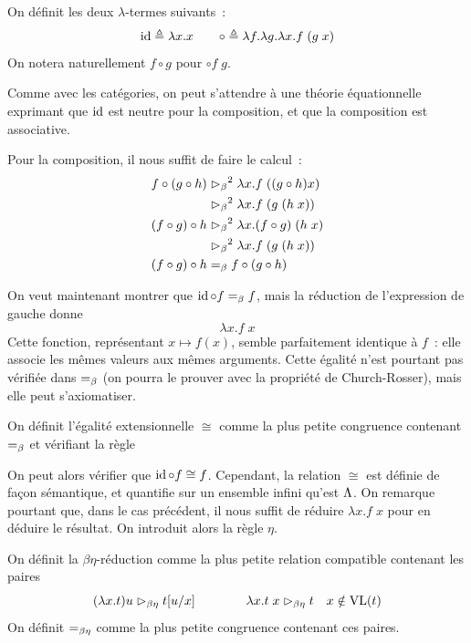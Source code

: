 \begin{definition}
  On définit les deux $\lambda$-termes suivants~:
  \[\operatorname{id} \triangleq \lambda x.x \qquad \mathord{\circ} \triangleq
  \lambda f.\lambda g.\lambda x.f\;(g\;x)\]
  On notera naturellement $f\circ g$ pour $\mathbin{\circ}f\;g$.
\end{definition}

Comme avec les catégories, on peut s'attendre à une théorie équationnelle
exprimant que $\operatorname{id}$ est neutre pour la composition, et que la composition est
associative.

Pour la composition, il nous suffit de faire le calcul~:
\begin{align*}
  f\circ (g\circ h) &\mathrel{\rhd_{\beta}}^2 \lambda x. f\;((g\circ h) x)\\
  &\mathrel{\rhd_{\beta}}^2 \lambda x. f\;(g\;(h\;x))\\
  (f\circ g)\circ h &\mathrel{\rhd_{\beta}}^2 \lambda x. (f\circ g)\;(h\;x)\\
  &\mathrel{\rhd_{\beta}}^2 \lambda x. f\;(g\;(h\;x))\\
  (f\circ g)\circ h &=_{\beta} f\circ (g\circ h)
\end{align*}

On veut maintenant montrer que $\operatorname{id}\circ f =_{\beta} f$, mais la réduction de
l'expression de gauche donne
\[\lambda x.f\;x\]
Cette fonction, représentant $x \mapsto f(x)$, semble parfaitement identique à
$f$~: elle associe les mêmes valeurs aux mêmes arguments. Cette égalité n'est
pourtant pas vérifiée dans $=_{\beta}$ (on pourra le prouver avec la propriété de
Church-Rosser), mais elle peut s'axiomatiser.

\begin{definition}
  On définit l'égalité extensionnelle $\cong$ comme la plus petite congruence
  contenant $=_{\beta}$ et vérifiant la règle
  \begin{prooftree}
  \end{prooftree}
\end{definition}

On peut alors vérifier que $\operatorname{id}\circ f \cong f$. Cependant, la relation $\cong$
est définie de façon sémantique, et quantifie sur un ensemble infini qu'est
$\Lambda$. On remarque pourtant que, dans le cas précédent, il nous suffit
de réduire $\lambda x.f\;x$ pour en déduire le résultat. On introduit alors
la règle $\eta$.

\begin{definition}
  On définit la $\beta\eta$-réduction comme la plus petite relation compatible
  contenant les paires
  \[(\lambda x.t)u \mathrel{\rhd_{\beta\eta}} t[u/x] \qquad\qquad
  \lambda x.t\;x \mathrel{\rhd_{\beta\eta}} t \quad x\notin \operatorname{VL}(t)\]
  On définit $\BEeq$ comme la plus petite congruence contenant ces paires.
  \index[notation]{$\bered$}
  \index[notation]{$\BEeq$}
\end{definition}

